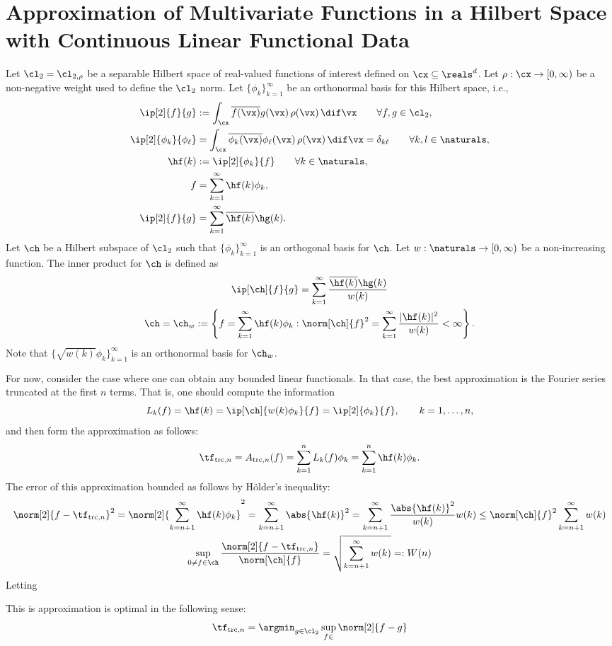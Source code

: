 \documentclass[12pt]{amsart}
\DeclareMathOperator{\trunc}{trc}
\begin{document}
\section{Approximation of Multivariate Functions in a Hilbert Space with Continuous Linear Functional Data}
Let $\cl_2=\cl_{2,\rho}$ be a separable Hilbert space of real-valued functions of interest defined on $\cx \subseteq \reals^d$.  Let $\rho: \cx \to [0,\infty)$ be a non-negative weight used to define the $\cl_2$ norm.  Let $\{\phi_k\}_{k=1}^{\infty}$ be an orthonormal basis for this Hilbert space, i.e., 
\begin{align*}
\ip[2]{f}{g} &:= \int_{\cx} \overline{f(\vx)} g(\vx) \, \rho(\vx) \, \dif \vx \qquad \forall f,g \in \cl_2,\\
\ip[2]{\phi_k}{\phi_{\ell}} &= \int_{\cx} \overline{\phi_k(\vx)} \phi_{\ell}(\vx) \, \rho(\vx) \, \dif \vx = \delta_{k\ell} \qquad \forall k,l \in \naturals,\\
\hf(k) &: = \ip[2]{\phi_k}{f} \qquad \forall k \in \naturals,\\
f &= \sum_{k=1}^{\infty} \hf(k) \phi_k, \\
\ip[2]{f}{g} &= \sum_{k=1}^\infty \overline{\hf(k)}\hg(k).
\end{align*}
Let $\ch$ be a Hilbert subspace of $\cl_2$ such that $\{\phi_k\}_{k=1}^{\infty}$ is an orthogonal basis for $\ch$.  Let $w:\naturals \to [0,\infty)$ be a non-increasing function.  The inner product for $\ch$ is defined as
\begin{gather*}
\ip[\ch]{f}{g} = \sum_{k=1}^\infty \frac{\overline{\hf(k)}\hg(k)}{w(k)} \\
\ch=\ch_{w} :=\left \{ f = \sum_{k=1}^{\infty} \hf(k) \phi_k : \norm[\ch]{f}^2 = \sum_{k=1}^\infty \frac{\lvert\hf(k)\rvert^2}{w(k)} < \infty \right\}.
\end{gather*}
Note that $\{\sqrt{w(k)}\phi_k\}_{k=1}^{\infty}$ is an orthonormal basis for $\ch_w$.

For now, consider the case where one can obtain any bounded linear functionals.  In that case, the best approximation is the Fourier series truncated at the first $n$ terms.  That is, one should compute the information 
\[
L_k(f) = \hf(k) = \ip[\ch]{w(k)\phi_k}{f}  = \ip[2]{\phi_k}{f}, \qquad k=1, \ldots, n,
\]
and then form the approximation as follows:
\[
\tf_{\trunc,n} = A_{\trunc,n}(f) = \sum_{k=1}^{n} L_k(f) \phi_k = \sum_{k=1}^{n} \hf(k) \phi_k.
\]
The error of this approximation bounded as follows by H\"older's inequality:
\begin{gather*}
\norm[2]{f - \tf_{\trunc,n}}^2 = \norm[2]{\sum_{k=n+1}^{\infty} \hf(k) \phi_k}^2 = \sum_{k=n+1}^{\infty} \abs{\hf(k)}^2 = \sum_{k=n+1}^{\infty} \frac{\abs{\hf(k)}^2}{w(k)} w(k) \le \norm[\ch]{f}^2 \sum_{k=n+1}^{\infty} w(k) \\
\sup_{0 \ne f \in \ch} \frac{\norm[2]{f - \tf_{\trunc,n}}}{\norm[\ch]{f}} =  \sqrt{\sum_{k=n+1}^{\infty} w(k)} =: W(n) \end{gather*}
Letting 


This is approximation is optimal in the following sense:
\[
\tf_{\trunc,n} = \argmin_{g \in \cl_2} \sup_{f \in } \norm[2]{f - g}
\]





\end{document}

